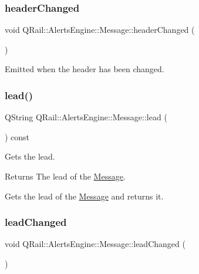\subsubsection{\texorpdfstring{headerChanged}{headerChanged}}
{\footnotesize\ttfamily void Q\+Rail\+::\+Alerts\+Engine\+::\+Message\+::header\+Changed (\begin{DoxyParamCaption}{ }\end{DoxyParamCaption})\hspace{0.3cm}{\ttfamily [signal]}}



Emitted when the header has been changed. 

\mbox{\label{classQRail_1_1AlertsEngine_1_1Message_a9dae467ea28e07e75d2b18f113516552}} 
\subsubsection{\texorpdfstring{lead()}{lead()}}
{\footnotesize\ttfamily Q\+String Q\+Rail\+::\+Alerts\+Engine\+::\+Message\+::lead (\begin{DoxyParamCaption}{ }\end{DoxyParamCaption}) const}



Gets the lead. 

\begin{DoxyReturn}{Returns}
The lead of the \mbox{\hyperlink{classQRail_1_1AlertsEngine_1_1Message}{Message}}.
\end{DoxyReturn}
Gets the lead of the \mbox{\hyperlink{classQRail_1_1AlertsEngine_1_1Message}{Message}} and returns it. \mbox{\label{classQRail_1_1AlertsEngine_1_1Message_a119795fc0c8d4c3b6d041844b83cf5ab}} 
\subsubsection{\texorpdfstring{leadChanged}{leadChanged}}
{\footnotesize\ttfamily void Q\+Rail\+::\+Alerts\+Engine\+::\+Message\+::lead\+Changed (\begin{DoxyParamCaption}{ }\end{DoxyParamCaption})\hspace{0.3cm}{\ttfamily [signal]}}



